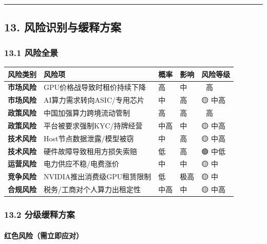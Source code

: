 \documentclass[UTF8,a4paper,12pt]{ctexart}
\begin{document}
\begin{center}\rule{0.5\linewidth}{0.5pt}\end{center}

\pagebreak

\subsection{13.
风险识别与缓释方案}\label{ux98ceux9669ux8bc6ux522bux4e0eux7f13ux91caux65b9ux6848}

\subsubsection{13.1 风险全景}\label{ux98ceux9669ux5168ux666f}

{\def\LTcaptype{none} %
\begin{longtable}[]{@{}lllll@{}}
\toprule\noalign{}
风险类别 & 风险项 & 概率 & 影响 & 风险等级 \\
\midrule\noalign{}
\endhead
\bottomrule\noalign{}
\endlastfoot
\textbf{市场风险} & GPU价格战导致时租价持续下降 & 高 & 中 & 🔴 高 \\
\textbf{市场风险} & AI算力需求转向ASIC/专用芯片 & 中 & 高 & 🟡 中高 \\
\textbf{政策风险} & 中国加强算力跨境流动管制 & 高 & 高 & 🔴 高 \\
\textbf{政策风险} & 平台被要求强制KYC/持牌经营 & 中高 & 中 & 🟡 中高 \\
\textbf{技术风险} & Host节点数据泄露/模型被窃 & 中 & 高 & 🟡 中高 \\
\textbf{技术风险} & 硬件故障导致租用方损失索赔 & 低 & 高 & 🟢 中低 \\
\textbf{运营风险} & 电力供应不稳/电费涨价 & 中 & 中 & 🟡 中 \\
\textbf{竞争风险} & NVIDIA推出消费级GPU租赁限制 & 低 & 极高 & 🟡 中 \\
\textbf{合规风险} & 税务/工商对个人算力出租定性 & 中高 & 中 & 🟡 中高 \\
\end{longtable}
}

\subsubsection{13.2
分级缓释方案}\label{ux5206ux7ea7ux7f13ux91caux65b9ux6848}

\paragraph{红色风险（需立即应对）}\label{ux7ea2ux8272ux98ceux9669ux9700ux7acbux5373ux5e94ux5bf9}
\end{document}
